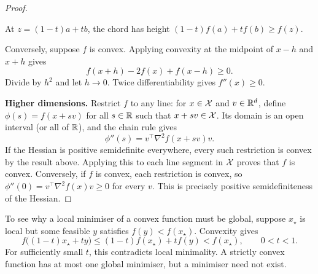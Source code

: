 \begin{proof}
\begin{center}
\begin{minipage}{0.9\linewidth}
\small At $z=(1-t)a+tb$, the chord has height $(1-t)f(a)+tf(b)\geq f(z)$.
\end{minipage}
\end{center}

Conversely, suppose $f$ is convex. Applying convexity at the midpoint of $x-h$ and $x+h$ gives
\begin{equation}
    f(x+h)-2f(x)+f(x-h)\geq0.
\end{equation}
Divide by $h^2$ and let $h\to0$. Twice differentiability gives $f''(x)\geq0$.

\textbf{Higher dimensions.} Restrict $f$ to any line: for $x\in{\mathcal X}$ and $v\in\mathbb{R}^d$, define $\phi(s)=f(x+sv)$ for all $s\in\mathbb{R}$ such that $x+sv\in{\mathcal X}$. Its domain is an open interval (or all of $\mathbb{R}$), and the chain rule gives
\begin{equation}
    \phi''(s)=v^\top\nabla^2 f(x+sv)v.
\end{equation}
If the Hessian is positive semidefinite everywhere, every such restriction is convex by the result above. Applying this to each line segment in ${\mathcal X}$ proves that $f$ is convex. Conversely, if $f$ is convex, each restriction is convex, so $\phi''(0)=v^\top\nabla^2 f(x)v\geq0$ for every $v$. This is precisely positive semidefiniteness of the Hessian.
\end{proof}

\begin{remark}
To see why a local minimiser of a convex function must be global, suppose $x_\star$ is local but some feasible $y$ satisfies $f(y)<f(x_\star)$. Convexity gives
\[
    f\bigl((1-t)x_\star+ty\bigr)
    \leq(1-t)f(x_\star)+tf(y)<f(x_\star),\qquad0<t<1.
\]
For sufficiently small $t$, this contradicts local minimality. A strictly convex function has at most one global minimiser, but a minimiser need not exist.
\end{remark}

